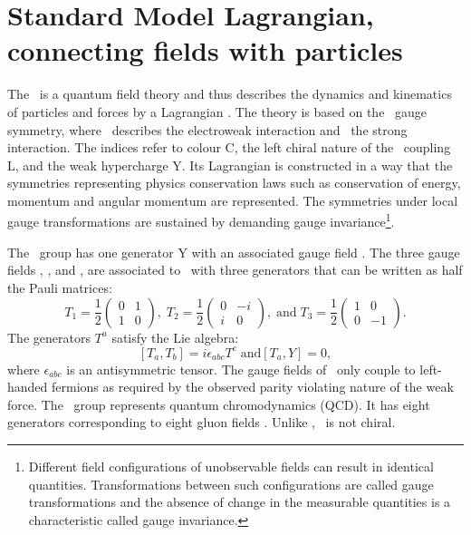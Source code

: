 \newpage
\section{Standard Model Lagrangian, connecting fields with particles}
\label{sec:SMlagr}
The \SM\ is a quantum field theory and thus describes the dynamics and kinematics of particles and forces by a Lagrangian \Lagr. The theory is based on the \SSU\ gauge symmetry, where \SU\ describes the electroweak interaction and \Sthree\ the strong interaction. The indices refer to colour C, the left chiral nature of the \Stwo\ coupling L, and the weak hypercharge Y. Its Lagrangian is constructed in a way that the symmetries representing physics conservation laws such as conservation of energy, momentum and angular momentum are represented. The symmetries under local gauge transformations are sustained by demanding gauge invariance\footnote{Different field configurations of unobservable fields can result in identical quantities. Transformations between such configurations are called gauge transformations and the absence of change in the measurable quantities is a characteristic called gauge invariance.}.  



The \Uone\ group has one generator Y with an associated gauge field \Bfield. The three gauge fields \Wfieldone, \Wfieldtwo, and \Wfieldthree, are associated to \Stwo\ with three generators that can  be written as half the Pauli matrices: 
\begin{equation}
T_1 =  \frac{1}{2}
\begin{pmatrix}
0  &  1      \\
1  & 0      
\end{pmatrix}, \;
T_2= \frac{1}{2}
\begin{pmatrix}
0  &  -i     \\
i  &  0      
\end{pmatrix},\;\mathrm{ and } \;
 T_3= \frac{1}{2}
 \begin{pmatrix}
 1  &  0     \\
 0  &  -1 
 \end{pmatrix}.
 \label{eq:Stwee}
\end{equation}
The generators $T^a$ satisfy the Lie algebra: 
\begin{equation}
 \left[T_a,T_b\right] = i \epsilon_{abc} T^c \; \mathrm{ and } \left[T_a, Y\right] = 0, 
\end{equation}
where $\epsilon_{abc}$ is an antisymmetric tensor. The gauge fields of \Stwo\ only couple to left-handed fermions as required by the observed parity violating nature of the weak force. The \Sthree\ group represents quantum chromodynamics (QCD). It  has eight generators corresponding to eight gluon fields \Gfields. Unlike \SU, \Sthree\ is not chiral. 

